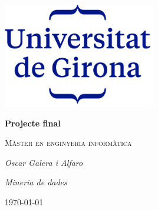 \documentclass[12pt]{article}
\begin{document}
\begin{titlepage}
		\centering
		\includegraphics[width=0.5\textwidth]{imatges/logo.png}\par\vspace{1cm}
		{\huge\bfseries Projecte final\par}
		\vspace{1cm}
		{\scshape\Large Màster en enginyeria informàtica\par}
		\vspace{1.5cm}
		{\Large\itshape Oscar Galera i Alfaro\par}
		\vspace{1cm}
		{\Large\itshape Mineria de dades\par}
		\vspace{2cm}
		\vfill
		\vfill
		{\large \today\par}
\end{titlepage}
\clearpage
\tableofcontents
\clearpage
\listoffigures


\clearpage
\end{document}
